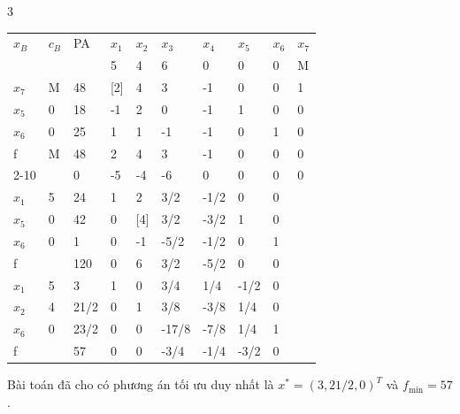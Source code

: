 \begin{Soln}{3}
\begin{tabular}{| l | l | l | l  l  l  l  l  l  l |}
\hline
$x_B$&$c_B$&PA&$x_1$&$x_2$&$x_3$&$x_4$&$x_5$&$x_6$&$x_7$\\
&&&5&4&6&0&0&0&M\\
\hline
$x_7$&M&48&[2]&4&3&-1&0&0&1\\
$x_5$&0&18&-1&2&0&-1&1&0&0\\
$x_6$&0&25&1&1&-1&-1&0&1&0\\
\hline
f &M&48&2&4&3&-1&0&0&0\\
\cline{2-10}
&&0&-5&-4&-6&0&0&0&0\\
\hline
$x_1$&5&24&1&2&3/2&-1/2&0&0&\\
$x_5$&0&42&0&[4]&3/2&-3/2&1&0&\\
$x_6$&0&1&0&-1&-5/2&-1/2&0&1&\\
\hline
f&&120&0&6&3/2&-5/2&0&0&\\
\hline
$x_1$&5&3&1&0&3/4&1/4&-1/2&0&\\
$x_2$&4&21/2&0&1&3/8&-3/8&1/4&0&\\
$x_6$&0&23/2&0&0&-17/8&-7/8&1/4&1&\\
\hline
f&&57&0&0&-3/4&-1/4&-3/2&0&\\
\hline
\end{tabular}

Bài toán đã cho có phương án tối ưu duy nhất là
$x^*=(3, 21/2, 0)^T$ và $f_{\min}=57$.
\end{Soln}

